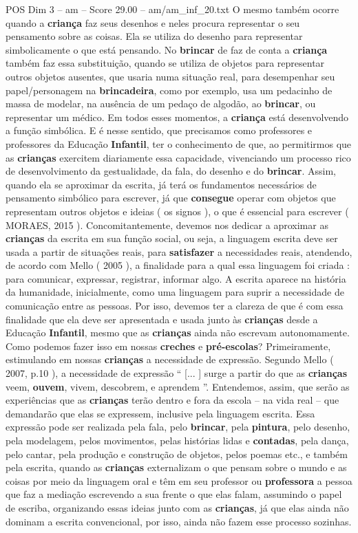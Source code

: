 \begin{textsample}{POS Dim 3 – am – Score 29.00 – am/am\_inf\_20.txt}
O mesmo também ocorre quando a \textbf{criança} faz seus desenhos e neles procura representar o seu pensamento sobre as coisas.
Ela se utiliza do desenho para representar simbolicamente o que está pensando.
No \textbf{brincar} de faz de conta a \textbf{criança} também faz essa substituição, quando se utiliza de objetos para representar outros objetos ausentes, que usaria numa situação real, para desempenhar seu papel/personagem na \textbf{brincadeira}, como por exemplo, usa um pedacinho de massa de modelar, na ausência de um pedaço de algodão, ao \textbf{brincar}, ou representar um médico.
Em todos esses momentos, a \textbf{criança} está desenvolvendo a função simbólica.
E é nesse sentido, que precisamos como professores e professores da Educação \textbf{Infantil}, ter o conhecimento de que, ao permitirmos que as \textbf{crianças} exercitem diariamente essa capacidade, vivenciando um processo rico de desenvolvimento da gestualidade, da fala, do desenho e do \textbf{brincar}.
Assim, quando ela se aproximar da escrita, já terá os fundamentos necessários de pensamento simbólico para escrever, já que \textbf{consegue} operar com objetos que representam outros objetos e ideias ( os signos ), o que é essencial para escrever ( MORAES, 2015 ).
Concomitantemente, devemos nos dedicar a aproximar as \textbf{crianças} da escrita em sua função social, ou seja, a linguagem escrita deve ser usada a partir de situações reais, para \textbf{satisfazer} a necessidades reais, atendendo, de acordo com Mello ( 2005 ), a finalidade para a qual essa linguagem foi criada : para comunicar, expressar, registrar, informar algo.
A escrita aparece na história da humanidade, inicialmente, como uma linguagem para suprir a necessidade de comunicação entre as pessoas.
Por isso, devemos ter a clareza de que é com essa finalidade que ela deve ser apresentada e usada junto às \textbf{crianças} desde a Educação \textbf{Infantil}, mesmo que as \textbf{crianças} ainda não escrevam autonomamente.
Como podemos fazer isso em nossas \textbf{creches} e \textbf{pré-escolas}?
Primeiramente, estimulando em nossas \textbf{crianças} a necessidade de expressão.
Segundo Mello ( 2007, p.10 ), a necessidade de expressão “ [... ] surge a partir do que as \textbf{crianças} veem, \textbf{ouvem}, vivem, descobrem, e aprendem ”.
Entendemos, assim, que serão as experiências que as \textbf{crianças} terão dentro e fora da escola – na vida real – que demandarão que elas se expressem, inclusive pela linguagem escrita.
Essa expressão pode ser realizada pela fala, pelo \textbf{brincar}, pela \textbf{pintura}, pelo desenho, pela modelagem, pelos movimentos, pelas histórias lidas e \textbf{contadas}, pela dança, pelo cantar, pela produção e construção de objetos, pelos poemas etc., e também pela escrita, quando as \textbf{crianças} externalizam o que pensam sobre o mundo e as coisas por meio da linguagem oral e têm em seu professor ou \textbf{professora} a pessoa que faz a mediação escrevendo a sua frente o que elas falam, assumindo o papel de escriba, organizando essas ideias junto com as \textbf{crianças}, já que elas ainda não dominam a escrita convencional, por isso, ainda não fazem esse processo sozinhas.

\end{textsample}
